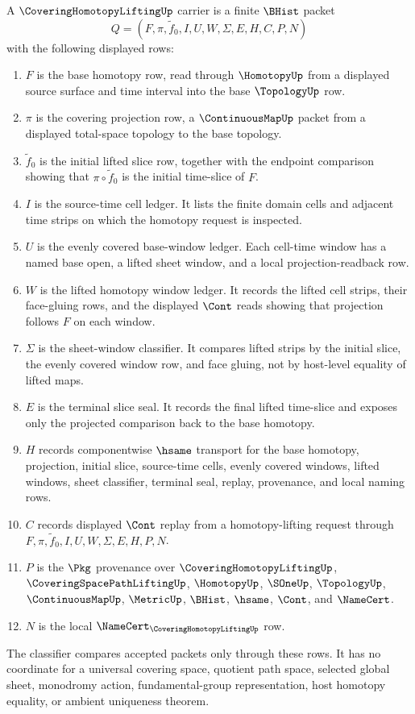 \begin{definition}
\label{def:covering-homotopy-lifting-carrier}
A $\CoveringHomotopyLiftingUp$ carrier is a finite $\BHist$ packet
$$
Q=(F,\pi,\tilde f_0,I,U,W,\Sigma,E,H,C,P,N)
$$
with the following displayed rows:
\begin{enumerate}
\item $F$ is the base homotopy row, read through $\HomotopyUp$ from a displayed source surface and time interval into the base $\TopologyUp$ row.
\item $\pi$ is the covering projection row, a $\ContinuousMapUp$ packet from a displayed total-space topology to the base topology.
\item $\tilde f_0$ is the initial lifted slice row, together with the endpoint comparison showing that $\pi \circ \tilde f_0$ is the initial time-slice of $F$.
\item $I$ is the source-time cell ledger. It lists the finite domain cells and adjacent time strips on which the homotopy request is inspected.
\item $U$ is the evenly covered base-window ledger. Each cell-time window has a named base open, a lifted sheet window, and a local projection-readback row.
\item $W$ is the lifted homotopy window ledger. It records the lifted cell strips, their face-gluing rows, and the displayed $\Cont$ reads showing that projection follows $F$ on each window.
\item $\Sigma$ is the sheet-window classifier. It compares lifted strips by the initial slice, the evenly covered window row, and face gluing, not by host-level equality of lifted maps.
\item $E$ is the terminal slice seal. It records the final lifted time-slice and exposes only the projected comparison back to the base homotopy.
\item $H$ records componentwise $\hsame$ transport for the base homotopy, projection, initial slice, source-time cells, evenly covered windows, lifted windows, sheet classifier, terminal seal, replay, provenance, and local naming rows.
\item $C$ records displayed $\Cont$ replay from a homotopy-lifting request through $F,\pi,\tilde f_0,I,U,W,\Sigma,E,H,P,N$.
\item $P$ is the $\Pkg$ provenance over $\CoveringHomotopyLiftingUp$, $\CoveringSpacePathLiftingUp$, $\HomotopyUp$, $\SOneUp$, $\TopologyUp$, $\ContinuousMapUp$, $\MetricUp$, $\BHist$, $\hsame$, $\Cont$, and $\NameCert$.
\item $N$ is the local $\NameCert_{\CoveringHomotopyLiftingUp}$ row.
\end{enumerate}
The classifier compares accepted packets only through these rows. It has no coordinate for a universal covering space, quotient path space, selected global sheet, monodromy action, fundamental-group representation, host homotopy equality, or ambient uniqueness theorem.
\end{definition}

